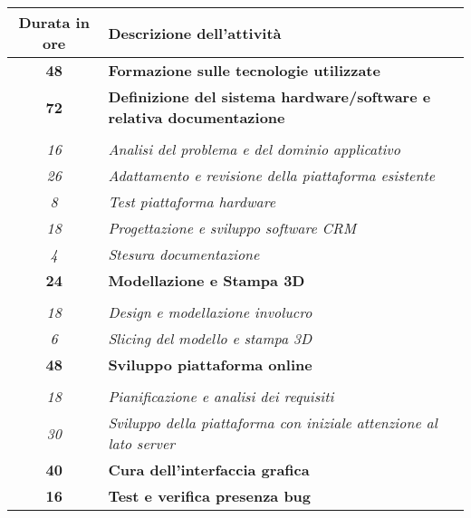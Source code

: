 

\begin{tabularx}{\textwidth}{|c|X|}
	\hline
	\textbf{Durata in ore} & \textbf{Descrizione dell'attività} \\\hline
	
	\textbf{48} & \textbf{Formazione sulle tecnologie utilizzate} \\	 
    \hline
    
    \textbf{72} & \textbf{Definizione del sistema hardware/software e relativa documentazione} \\ \hdashline 
    \multirow{3}{0cm}\\ 
    \textit{16} & 
    \textit{Analisi del problema e del dominio applicativo} \\
    \textit{26} & 
    \textit{Adattamento e revisione della piattaforma esistente} \\
    \textit{8} & 
    \textit{Test piattaforma hardware} \\
    \textit{18} & 
    \textit{Progettazione e sviluppo software CRM} \\
    \textit{4} & 
    \textit{Stesura documentazione} \\
    \hline
    
    \textbf{24} & \textbf{Modellazione e Stampa 3D}  \\ \hdashline 
    \multirow{4}{0cm}\\ 
    \textit{18} & 
    \textit{Design e modellazione involucro} \\
    \textit{6} & 
    \textit{Slicing del modello e stampa 3D} \\
    \hline
    
    \textbf{48} & \textbf{Sviluppo piattaforma online}  \\ \hdashline 
    \multirow{4}{0cm}\\ 
    \textit{18} & 
    \textit{Pianificazione e analisi dei requisiti} \\
    \textit{30} & 
    \textit{Sviluppo della piattaforma con iniziale attenzione al lato server} \\
    \hline
    
    \textbf{40} & \textbf{Cura dell'interfaccia grafica}  \\ 
    \hline
    
    \textbf{16} & \textbf{Test e verifica presenza bug}  \\
    \hline
    

\end{tabularx}
